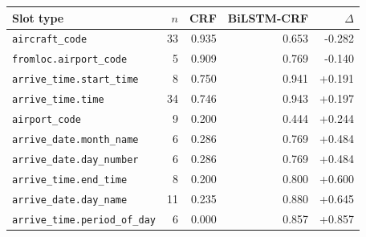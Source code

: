 \begin{tabular}{@{}lrrrr@{}}
\toprule
Slot type & $n$ & CRF & BiLSTM-CRF & $\Delta$ \\
\midrule
\texttt{aircraft\_code} & 33 & 0.935 & 0.653 & -0.282 \\
\texttt{fromloc.airport\_code} & 5 & 0.909 & 0.769 & -0.140 \\
\texttt{arrive\_time.start\_time} & 8 & 0.750 & 0.941 & +0.191 \\
\texttt{arrive\_time.time} & 34 & 0.746 & 0.943 & +0.197 \\
\texttt{airport\_code} & 9 & 0.200 & 0.444 & +0.244 \\
\texttt{arrive\_date.month\_name} & 6 & 0.286 & 0.769 & +0.484 \\
\texttt{arrive\_date.day\_number} & 6 & 0.286 & 0.769 & +0.484 \\
\texttt{arrive\_time.end\_time} & 8 & 0.200 & 0.800 & +0.600 \\
\texttt{arrive\_date.day\_name} & 11 & 0.235 & 0.880 & +0.645 \\
\texttt{arrive\_time.period\_of\_day} & 6 & 0.000 & 0.857 & +0.857 \\
\bottomrule
\end{tabular}
